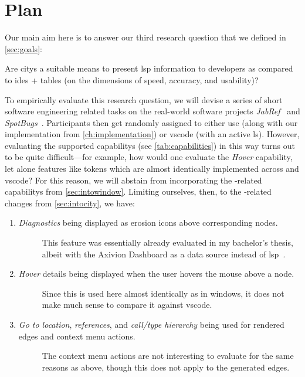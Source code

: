 \documentclass[../thesis]{subfiles}
\begin{document}
\section{Plan}\label{sec:plan}
Our main aim here is to answer our third research question that we defined in \cref{sec:goals}:
\begin{displayquote}
	Are \glspl{city} a suitable means to present \gls{lsp} information to developers as compared to \glspl{ide} + tables (on the dimensions of speed, accuracy, and usability)?
\end{displayquote}

To empirically evaluate this research question, we will devise a series of short software engineering related tasks on the real-world software projects \emph{JabRef}~\cite{jabref} and \emph{SpotBugs}~\cite{spotbugs}.
Participants then get randomly assigned to either use \SEE{} (along with our implementation from \cref{ch:implementation}) or \gls{vscode} (with an active \gls{ls}).
However, evaluating the supported \glspl{capability} (see \cref{tab:capabilities}) in this way turns out to be quite difficult---for example, how would one evaluate the \emph{Hover} \gls{capability}, let alone features like \glspl{token} which are almost identically implemented across \SEE{} and \gls{vscode}?
For this reason, we will abstain from incorporating the -related \glspl{capability} from \cref{sec:intowindow}.
Limiting ourselves, then, to the -related changes from \cref{sec:intocity}, we have:
\begin{enumerate}
	\item \emph{Diagnostics} being displayed as erosion icons above corresponding nodes.
	      \begin{description}
		      \item[\follows{}] This feature was essentially already evaluated in my bachelor's thesis, albeit with the Axivion Dashboard as a data source instead of \gls{lsp}~\cite{galperin2021,galperin2022}.
	      \end{description}
	\item \emph{Hover} details being displayed when the user hovers the mouse above a node.
	      \begin{description}
		      \item[\follows{}] Since this is used here almost identically as in \glspl{window}, it does not make much sense to compare it against \gls{vscode}.
	      \end{description}
	\item \emph{Go to location}, \emph{references}, and \emph{call/type hierarchy} being used for rendered edges and context menu actions.
	      \begin{description}
		      \item[\follows{}] The context menu actions are not interesting to evaluate for the same reasons as above, though this does not apply to the generated edges.
	      \end{description}
\end{enumerate}
\end{document}
